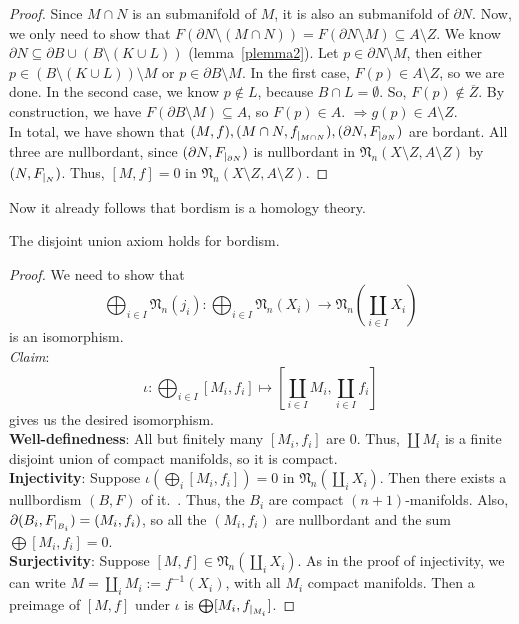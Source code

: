 \documentclass[a4paper,11pt]{article}
\begin{document}
\begin{proof}
    Since \(M\cap N\) is an submanifold of \(M\), it is also an submanifold of \(\partial N\). 
    Now, we only need to show that \(F(\partial N\setminus(M\cap N))=F(\partial N\setminus M)\subseteq A\setminus Z\). 
    We know \(\partial N\subseteq\partial B\cup(B\setminus(K\cup L))\) (lemma\ \ref{plemma2}). 
    Let \(p\in\partial N\setminus M\), then either \(p\in(B\setminus(K\cup L))\setminus M\) or \(p\in\partial B\setminus M\). In the first case, \(F(p)\in A\setminus Z\), so we are done. 
    In the second case, we know \(p\notin L\), because \(B\cap L=\emptyset\). So, \(F(p)\notin\overline{Z}\). By construction, we have \(F(\partial B\setminus M)\subseteq A\), so \(F(p)\in A\). \(\Rightarrow g(p)\in A\setminus Z\).\\
    In total, we have shown that \((M,f), (M\cap N,f_{|_{M\cap N}}), (\partial N,F_{|_{\partial N}})\) are bordant. All three are nullbordant, since \((\partial N,F_{|_{\partial N}})\) is nullbordant in \(\mathfrak{N}_n(X\setminus Z,A\setminus Z)\) by \((N,F_{|_{N}})\). Thus, \([M,f]=0\) in \(\mathfrak N_n(X\setminus Z,A\setminus Z)\).
\end{proof}

Now it already follows that bordism is a homology theory.\ 

\begin{lemma}\label{disjoint union}
    The disjoint union axiom holds for bordism.
\end{lemma}

\begin{proof}\cite{zhang}
    We need to show that 
    \[\bigoplus_{i\in I}\mathfrak{N}_n(j_i):\bigoplus_{i\in I}\mathfrak{N}_n(X_i)\to\mathfrak{N}_n\left(\coprod_{i\in I}X_i\right)\] 
    is an isomorphism.\\
    \textit{Claim}: \[\iota:\bigoplus_{i\in I}[M_i,f_i]\mapsto \left[\coprod_{i\in I}M_i,\coprod_{i\in I} f_i\right]\]
    gives us the desired isomorphism.\\
    \textbf{Well-definedness}: All but finitely many \([M_i,f_i]\) are \(0\). Thus, \(\coprod M_i\) is a finite disjoint union of compact manifolds, so it is compact.\\
    \textbf{Injectivity}: Suppose \(\iota\left(\bigoplus_i[M_i,f_i]\right)=0\) in \(\mathfrak{N}_n(\coprod_i X_i)\). 
    Then there exists a nullbordism \((B,F)\) of it.\ . 
    Thus, the \(B_i\) are compact \((n+1)\)-manifolds. Also, \(\partial(B_i,F_{|_{B_i}})=(M_i,f_i)\), so all the \((M_i,f_i)\) are nullbordant and the sum \(\bigoplus[M_i,f_i]=0\).
    \\
    \textbf{Surjectivity}: Suppose \([M,f]\in\mathfrak{N}_n(\coprod_i X_i)\). As in the proof of injectivity, we can write \(M=\coprod_i M_i:=f^{-1}(X_i)\), with all \(M_i\) compact manifolds. Then a preimage of \([M,f]\) under \(\iota\) is \(\bigoplus[M_i,f_{|_{M_i}}]\).
\end{proof}
\end{document}
